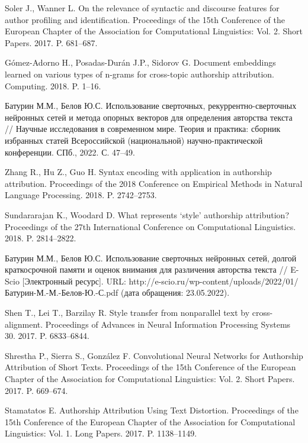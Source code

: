 \begin{thebibliography}{9}
    \makeatletter
    \renewcommand\@biblabel[1]{{#1.}}
    \makeatother
    Soler J., Wanner L. On the relevance of syntactic and discourse features for author profiling and identification. Proceedings of the 15th Conference of the European Chapter of the Association for Computational Linguistics: Vol. 2. Short Papers. 2017. P. 681–687.
    
    Gómez-Adorno H., Posadas-Durán J.P., Sidorov G. Document embeddings learned on various types of n-grams for cross-topic authorship attribution. Computing. 2018. P. 1–16.
    
    Батурин М.М., Белов Ю.С. Использование сверточных, рекуррентно-сверточных нейронных сетей и метода опорных векторов для определения авторства текста // Научные исследования в современном мире. Теория и практика: сборник избранных статей Всероссийской (национальной) научно-практической конференции. СПб., 2022. С. 47–49.
    
    Zhang R., Hu Z., Guo H. Syntax encoding with application in authorship attribution. Proceedings of the 2018 Conference on Empirical Methods in Natural Language Processing. 2018. P. 2742–2753.
    
    Sundararajan K., Woodard D. What represents ‘style’ authorship attribution? Proceedings of the 27th International Conference on Computational Linguistics. 2018. P. 2814–2822.
    
    Батурин М.М., Белов Ю.С. Использование сверточных нейронных сетей, долгой краткосрочной памяти и оценок внимания для различения авторства текста // E-Scio [Электронный ресурс]. URL: http://e-scio.ru/wp-content/uploads/2022/01/Батурин-М.-М.-Белов-Ю.-С.pdf (дата обращения: 23.05.2022).
    
    Shen T., Lei T., Barzilay R. Style transfer from nonparallel text by cross-alignment. Proceedings of Advances in Neural Information Processing Systems 30. 2017. P. 6833–6844.
    
    Shrestha P., Sierra S., González F. Convolutional Neural Networks for Authorship Attribution of Short Texts. Proceedings of the 15th Conference of the European Chapter of the Association for Computational Linguistics: Vol. 2. Short Papers. 2017. P. 669–674.
    
    Stamatatos E. Authorship Attribution Using Text Distortion. Proceedings of the 15th Conference of the European Chapter of the Association for Computational Linguistics: Vol. 1. Long Papers. 2017. P. 1138–1149.
    
    \end{thebibliography}